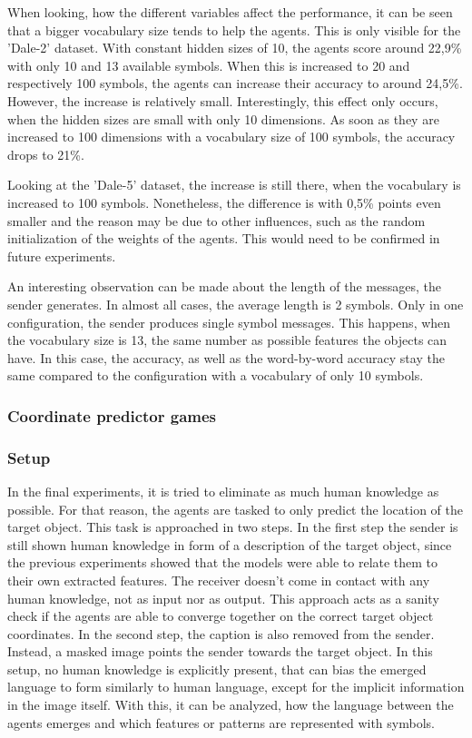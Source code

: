 When looking, how the different variables affect the performance, it can be seen that a bigger vocabulary size tends to help the agents.
This is only visible for the 'Dale-2' dataset.
With constant hidden sizes of 10, the agents score around 22,9\% with only 10 and 13 available symbols.
When this is increased to 20 and respectively 100 symbols, the agents can increase their accuracy to around 24,5\%.
However, the increase is relatively small.
Interestingly, this effect only occurs, when the hidden sizes are small with only 10 dimensions.
As soon as they are increased to 100 dimensions with a vocabulary size of 100 symbols, the accuracy drops to 21\%.

Looking at the 'Dale-5' dataset, the increase is still there, when the vocabulary is increased to 100 symbols.
Nonetheless, the difference is with 0,5\% points even smaller and the reason may be due to other influences, such as the random initialization of the weights of the agents.
This would need to be confirmed in future experiments.

An interesting observation can be made about the length of the messages, the sender generates.
In almost all cases, the average length is 2 symbols.
Only in one configuration, the sender produces single symbol messages.
This happens, when the vocabulary size is 13, the same number as possible features the objects can have.
In this case, the accuracy, as well as the word-by-word accuracy stay the same compared to the configuration with a vocabulary of only 10 symbols.


\subsubsection{Coordinate predictor games}
\subsubsection*{Setup}
In the final experiments, it is tried to eliminate as much human knowledge as possible.
For that reason, the agents are tasked to only predict the location of the target object.
This task is approached in two steps.
In the first step the sender is still shown human knowledge in form of a description of the target object, since the previous experiments showed that the models were able to relate them to their own extracted features.
The receiver doesn't come in contact with any human knowledge, not as input nor as output.
This approach acts as a sanity check if the agents are able to converge together on the correct target object coordinates.
In the second step, the caption is also removed from the sender.
Instead, a masked image points the sender towards the target object.
In this setup, no human knowledge is explicitly present, that can bias the emerged language to form similarly to human language, except for the implicit information in the image itself.
With this, it can be analyzed, how the language between the agents emerges and which features or patterns are represented with symbols.

